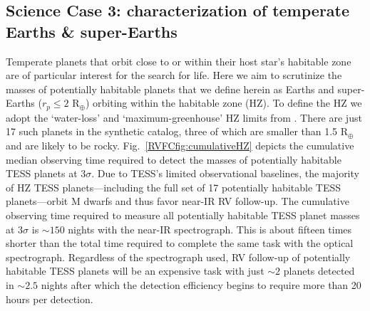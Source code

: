 \subsection{Science Case 3: characterization of temperate Earths \& super-Earths}
Temperate planets that orbit close to or within their host star's habitable zone are of particular
interest for the search for life.
Here we aim to scrutinize the masses of potentially habitable planets that we define herein as
Earths and super-Earths ($r_p \leq 2$ R$_{\oplus}$) orbiting within the habitable zone (HZ). To define
the HZ we adopt
the `water-loss' and `maximum-greenhouse' HZ limits from \cite{kopparapu13}. There are just 17 such
planets in the  synthetic catalog, three of which are smaller than 1.5
R$_{\oplus}$ and are likely to be rocky. 
Fig.~\ref{RVFCfig:cumulativeHZ} depicts the cumulative median observing time required to detect the masses
of potentially habitable TESS planets at $3\sigma$.
Due to TESS's limited observational baselines, the majority of HZ TESS
planets---including the full set of 17 potentially habitable TESS planets---orbit M dwarfs and thus
favor near-IR RV follow-up. The cumulative observing time required to measure all potentially
habitable TESS planet masses at $3\sigma$ is $\sim 150$ nights with
the near-IR spectrograph. This is about fifteen times shorter than the total time required
to complete the same task with the optical spectrograph. Regardless of the spectrograph
used, RV follow-up of potentially habitable TESS planets will be an expensive task with
just $\sim 2$ planets detected in $\sim 2.5$ nights after which the detection
efficiency begins to require more than 20 hours per detection.

